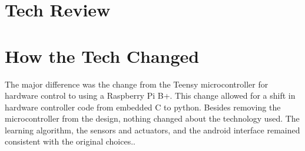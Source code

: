 \section{Tech Review}


\section{How the Tech Changed}
The major difference was the change from the Teensy microcontroller for hardware control to using a Raspberry Pi B+. This change
allowed for a shift in hardware controller code from embedded C to python.
Besides removing the microcontroller from the design, nothing changed about the technology used.
The learning algorithm, the sensors and actuators, and the android interface remained consistent with the original choices..
